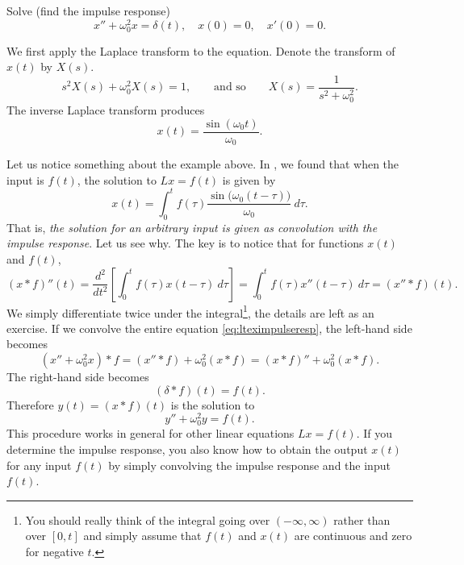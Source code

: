 \begin{example}
Solve (find the impulse response)
\begin{equation} \label{eq:lteximpulseresp}
x'' + \omega_0^2 x = \delta(t) , \quad x(0) = 0, \quad x'(0) = 0 .
\end{equation}

We first apply the Laplace transform to the equation.  Denote
the transform of $x(t)$ by $X(s)$.
\begin{equation*}
s^2 X(s) + \omega_0^2 X(s) = 1 ,
\qquad \text{and so} \qquad
X(s) = \frac{1}{s^2+ \omega_0^2} .
\end{equation*}
The inverse Laplace transform produces
\begin{equation*}
x(t) = 
\frac{\sin (\omega_0 t)}{\omega_0} .
\end{equation*}
\end{example}

Let us notice something about the example above. 
In ,
we found that
when the input is $f(t)$, the solution to $Lx = f(t)$
is given by
\begin{equation*}
x(t) = 
\int_0^t
f(\tau) 
\frac{\sin \bigl( \omega_0 (t-\tau) \bigr)}{\omega_0} ~ d\tau .
\end{equation*}
That is, \emph{the solution for an arbitrary input is given as
convolution with the impulse response}.  Let us see why.
The key is to notice that for functions $x(t)$ and $f(t)$,
\begin{equation*}
(x * f)''(t) =
\frac{d^2}{dt^2}\left[
\int_0^t
f(\tau) 
x(t-\tau) ~ d\tau \right]
=
\int_0^t
f(\tau) 
x''(t-\tau) ~ d\tau
= (x'' * f)(t) .
\end{equation*}
We simply differentiate twice under the
integral\footnote{You should really think of the integral going over
$(-\infty,\infty)$ rather than over $[0,t]$ and simply assume that $f(t)$ and
$x(t)$ are continuous and zero for negative $t$.}, the details are
left as an exercise.
If we convolve the entire equation \eqref{eq:lteximpulseresp},
the left-hand side becomes
\begin{equation*}
(x'' + \omega_0^2 x) * f =
(x'' * f) + \omega_0^2 (x * f) =
(x * f)'' + \omega_0^2 (x * f) .
\end{equation*}
The right-hand side becomes
\begin{equation*}
(\delta * f)(t) = f(t).
\end{equation*}
Therefore $y(t) = (x * f)(t)$ is the solution to
\begin{equation*}
y'' + \omega_0^2 y = f(t) .
\end{equation*}
This procedure works in general for other linear
equations $Lx = f(t)$.  If you determine the impulse response,
you also know how to obtain the output $x(t)$ for any input $f(t)$
by simply convolving
the impulse response and the input $f(t)$.

